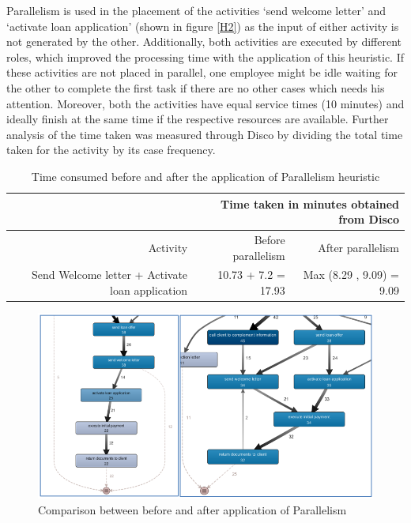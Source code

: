 \documentclass[a4paper]{article} %
\begin{document}
Parallelism is used in the placement of the activities ‘send welcome letter’ and ‘activate loan application’ (shown in figure \ref{H2}) as the input of either activity is not generated by the other. Additionally, both activities are executed by different roles, which improved the processing time with the application of this heuristic. If these activities are not placed in parallel, one employee might be idle waiting for the other to complete the first task if there are no other cases which needs his attention. Moreover, both the activities have equal service times (10 minutes) and ideally finish at the same time if the respective resources are available. Further analysis of the time taken was measured through Disco by dividing the total time taken for the activity by its case frequency.\\

\begin{table}[htbp]
  \centering
  
    \begin{tabular}{|r|r|r|}
    \hline
          & \multicolumn{2}{p{20.715em}|}{Time taken in minutes obtained from Disco} \bigstrut\\
    \hline
    Activity & Before parallelism & After parallelism \bigstrut\\
    \hline
    Send Welcome letter + Activate loan application & 10.73 + 7.2 = 17.93 & Max (8.29 , 9.09) = 9.09 \bigstrut\\
    \hline
    \end{tabular}%
    \caption{Time consumed before and after the application of Parallelism heuristic}
  \label{tab:parallelism_heuristic}%
\end{table}%

\begin{figure}
\centering
\includegraphics[scale=1]{h1}
\caption{Comparison between before and after application of Parallelism}
\label{H1}
\end{figure}
\end{document}
